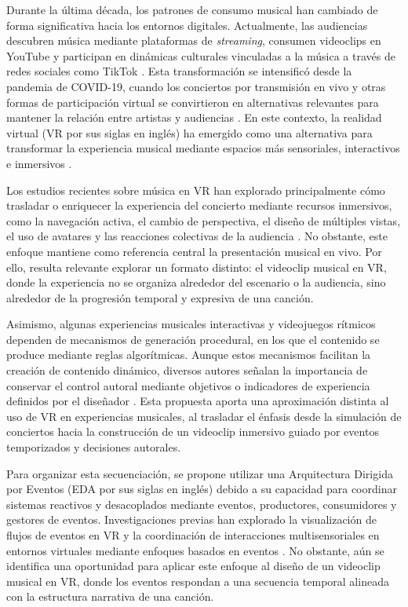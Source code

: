 Durante la última década, los patrones de consumo musical han cambiado de forma significativa hacia los entornos digitales. Actualmente, las audiencias descubren música mediante plataformas de \emph{streaming}, consumen videoclips en YouTube y participan en dinámicas culturales vinculadas a la música a través de redes sociales como TikTok \cite{onderdijk2023concert}. Esta transformación se intensificó desde la pandemia de COVID-19, cuando los conciertos por transmisión en vivo y otras formas de participación virtual se convirtieron en alternativas relevantes para mantener la relación entre artistas y audiencias \cite{onderdijk2023concert}. En este contexto, la realidad virtual (VR por sus siglas en inglés) ha emergido como una alternativa para transformar la experiencia musical mediante espacios más sensoriales, interactivos e inmersivos \cite{rivas2025diseno}.

Los estudios recientes sobre música en VR han explorado principalmente cómo trasladar o enriquecer la experiencia del concierto mediante recursos inmersivos, como la navegación activa, el cambio de perspectiva, el diseño de múltiples vistas, el uso de avatares y las reacciones colectivas de la audiencia \cite{lo2023immersive,lee2025concert,yan2020social,kim2022multiview,lee2023viewing,cacciuttolo2021welcome}. No obstante, este enfoque mantiene como referencia central la presentación musical en vivo. Por ello, resulta relevante explorar un formato distinto: el videoclip musical en VR, donde la experiencia no se organiza alrededor del escenario o la audiencia, sino alrededor de la progresión temporal y expresiva de una canción.

Asimismo, algunas experiencias musicales interactivas y videojuegos rítmicos dependen de mecanismos de generación procedural, en los que el contenido se produce mediante reglas algorítmicas. Aunque estos mecanismos facilitan la creación de contenido dinámico, diversos autores señalan la importancia de conservar el control autoral mediante objetivos o indicadores de experiencia definidos por el diseñador \cite{yannakakis2011experience,khaled2013design,craveirinha2015designing}. Esta propuesta aporta una aproximación distinta al uso de VR en experiencias musicales, al trasladar el énfasis desde la simulación de conciertos hacia la construcción de un videoclip inmersivo guiado por eventos temporizados y decisiones autorales.

Para organizar esta secuenciación, se propone utilizar una Arquitectura Dirigida por Eventos (EDA por sus siglas en inglés) debido a su capacidad para coordinar sistemas reactivos y desacoplados mediante eventos, productores, consumidores y gestores de eventos. Investigaciones previas han explorado la visualización de flujos de eventos en VR \cite{oberhauser2023vr} y la coordinación de interacciones multisensoriales en entornos virtuales mediante enfoques basados en eventos \cite{edmunds2006mixed}. No obstante, aún se identifica una oportunidad para aplicar este enfoque al diseño de un videoclip musical en VR, donde los eventos respondan a una secuencia temporal alineada con la estructura narrativa de una canción.

